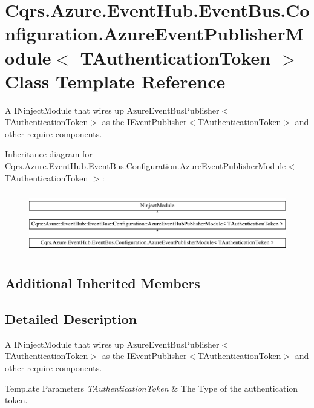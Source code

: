 \hypertarget{classCqrs_1_1Azure_1_1EventHub_1_1EventBus_1_1Configuration_1_1AzureEventPublisherModule}{}\section{Cqrs.\+Azure.\+Event\+Hub.\+Event\+Bus.\+Configuration.\+Azure\+Event\+Publisher\+Module$<$ T\+Authentication\+Token $>$ Class Template Reference}
\label{classCqrs_1_1Azure_1_1EventHub_1_1EventBus_1_1Configuration_1_1AzureEventPublisherModule}


A I\+Ninject\+Module that wires up Azure\+Event\+Bus\+Publisher$<$\+T\+Authentication\+Token$>$ as the I\+Event\+Publisher$<$\+T\+Authentication\+Token$>$ and other require components.  


Inheritance diagram for Cqrs.\+Azure.\+Event\+Hub.\+Event\+Bus.\+Configuration.\+Azure\+Event\+Publisher\+Module$<$ T\+Authentication\+Token $>$\+:\begin{figure}[H]
\begin{center}
\leavevmode
\includegraphics[height=2.696629cm]{classCqrs_1_1Azure_1_1EventHub_1_1EventBus_1_1Configuration_1_1AzureEventPublisherModule}
\end{center}
\end{figure}
\subsection*{Additional Inherited Members}


\subsection{Detailed Description}
A I\+Ninject\+Module that wires up Azure\+Event\+Bus\+Publisher$<$\+T\+Authentication\+Token$>$ as the I\+Event\+Publisher$<$\+T\+Authentication\+Token$>$ and other require components. 


\begin{DoxyTemplParams}{Template Parameters}
{\em T\+Authentication\+Token} & The Type of the authentication token.\\
\hline
\end{DoxyTemplParams}
